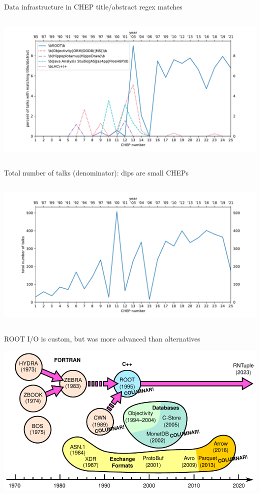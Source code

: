 \documentclass[aspectratio=169]{beamer}
\begin{document}
\begin{frame}{Data infrastructure in CHEP title/abstract regex matches}
\vspace{0.15 cm}
\begin{columns}
\includegraphics[width=\linewidth]{PLOTS/chep-papers-package-1.pdf}
\end{columns}
\end{frame}

\begin{frame}{Total number of talks (denominator): dips are small CHEPs}
\vspace{0.15 cm}
\begin{columns}
\includegraphics[width=\linewidth]{PLOTS/chep-papers-denominator.pdf}
\end{columns}
\end{frame}

\begin{frame}{ROOT I/O is custom, but was more advanced than alternatives}
\vspace{0.1 cm}
\begin{center}
\includegraphics[width=\linewidth]{PLOTS/history.pdf}
\end{center}
\end{frame}
\end{document}

